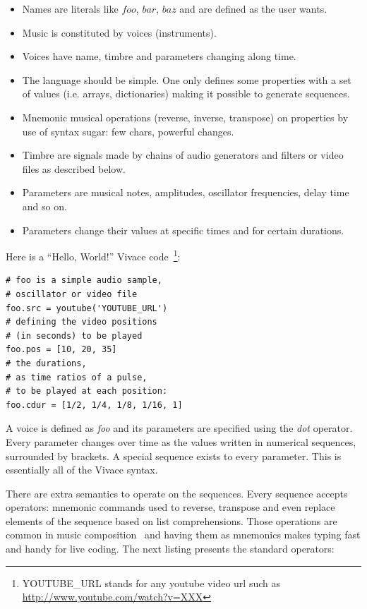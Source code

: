 \documentclass[12pt,times,twocolumn]{article}
\begin{document}
\begin{itemize}
	\item Names are literals like $foo$, $bar$, $baz$ and are defined as
	  the user wants.
	\item Music is constituted by voices (instruments).
	\item Voices have name, timbre and parameters changing along time.
	\item The language should be simple. One only defines some properties with a set of
	  values (i.e. arrays, dictionaries) making it possible to generate
	  sequences.
	\item Mnemonic musical operations (reverse, inverse, transpose) on
	  properties by use of syntax sugar: few chars, powerful changes.
	\item Timbre are signals made by chains of audio generators and
	  filters or video files as described below.
	\item Parameters are musical notes, amplitudes, oscillator
	  frequencies, delay time and so on.
	\item Parameters change their values at specific times and for certain
  durations.
\end{itemize}

Here is a ``Hello, World!'' Vivace code~\footnote{YOUTUBE\_URL
stands for any youtube video url such as \url{http://www.youtube.com/watch?v=XXX}}:

\begin{Verbatim}[fontfamily=courier, xleftmargin=\parindent,fontsize=\footnotesize]
# foo is a simple audio sample,
# oscillator or video file
foo.src = youtube('YOUTUBE_URL')
# defining the video positions
# (in seconds) to be played
foo.pos = [10, 20, 35]
# the durations,
# as time ratios of a pulse,
# to be played at each position:
foo.cdur = [1/2, 1/4, 1/8, 1/16, 1]
\end{Verbatim}


A voice is defined as \textit{foo} and its parameters are specified
using the \textit{dot} operator. Every parameter changes over time as
the values written in numerical sequences, surrounded by brackets. A
special sequence exists to every parameter. This is essentially all of
the Vivace syntax.

There are extra semantics to operate on the sequences. Every sequence
accepts operators: mnemonic commands used to reverse, transpose and
even replace elements of the sequence based on list
comprehensions. Those operations are common in music composition~\cite{collins2011live} and
having them as mnemonics makes typing fast and handy for live
coding. The next listing presents the standard operators:
\end{document}

